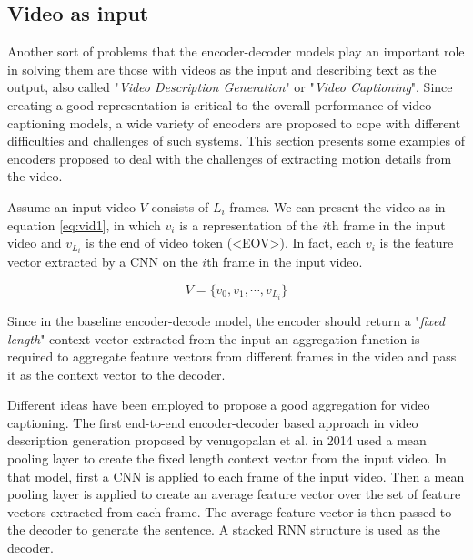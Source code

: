 \documentclass[preprint, 12pt]{elsarticle}
\begin{document}
		\subsection{Video as input}
		Another sort of problems that the encoder-decoder models play an important role in solving them are those with videos as the input and describing text as the output, also called "\textit{Video Description Generation}" or "\textit{Video Captioning}". Since creating a good representation is critical to the overall performance of video captioning models, a wide variety of encoders are proposed to cope with different difficulties and challenges of such systems. This section presents some examples of encoders proposed to deal with the challenges of extracting motion details from the video.
		
		Assume an input video $V$ consists of $L_i$ frames. We can present the video as in equation \eqref{eq:vid1}, in which $v_i$ is a representation of the $i$th frame in the input video and $v_{L_i}$ is the end of video token (<EOV>). In fact, each $v_i$ is the feature vector extracted by a CNN on the $i$th frame in the input video.
		
		\begin{equation}
			V = \{v_0, v_1, \cdots, v_{L_i}\}
			\label{eq:vid1}
		\end{equation}
		
		Since in the baseline encoder-decode model, the encoder should return a "\textit{fixed length}" context vector extracted from the input an aggregation function is required to aggregate feature vectors from different frames in the video and pass it as the context vector to the decoder. 
		
		Different ideas have been employed to propose a good aggregation for video captioning. The first end-to-end encoder-decoder based approach in video description generation proposed by venugopalan et al. in 2014 \cite{venugopalan2014translating} used a mean pooling layer to create the fixed length context vector from the input video. In that model, first a CNN is applied to each frame of the input video. Then a mean pooling layer is applied to create an average feature vector over the set of feature vectors extracted from each frame. The average feature vector is then passed to the decoder to generate the sentence. A stacked RNN structure is used as the decoder.
		
\end{document}
